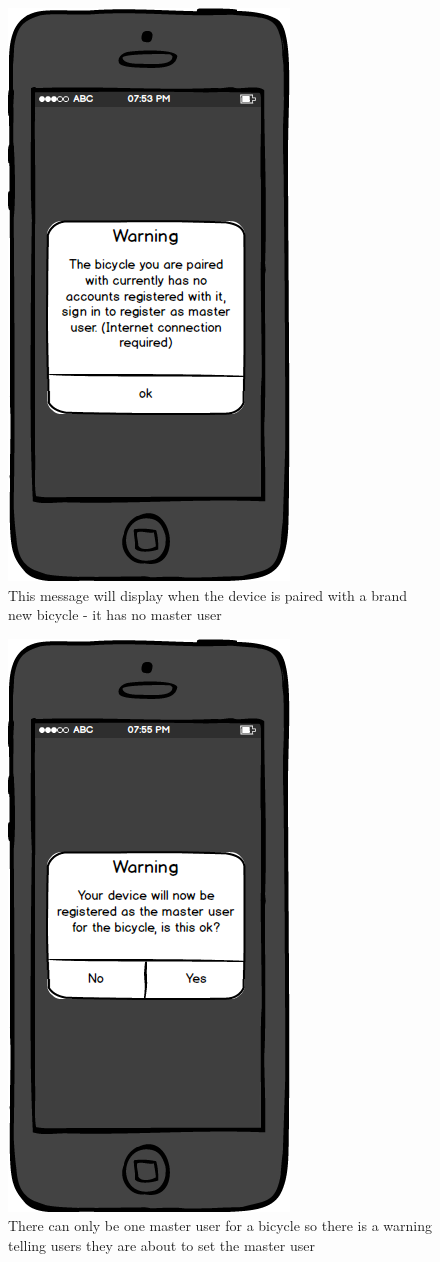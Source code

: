 \documentclass[a4paper]{report}
\begin{document}
\clearpage
\begin{figure}
\centering
\includegraphics[scale=0.9]{figures/prototype_2/already_reg}
\caption{This message will display when the device is paired with a brand new bicycle - it has no master user}
\end{figure}
\clearpage
\begin{figure}
\centering
\includegraphics[scale=0.9]{figures/prototype_2/reg_warn}
\caption{There can only be one master user for a bicycle so there is a warning telling users they are about to set the master user}
\end{figure}
\end{document}
